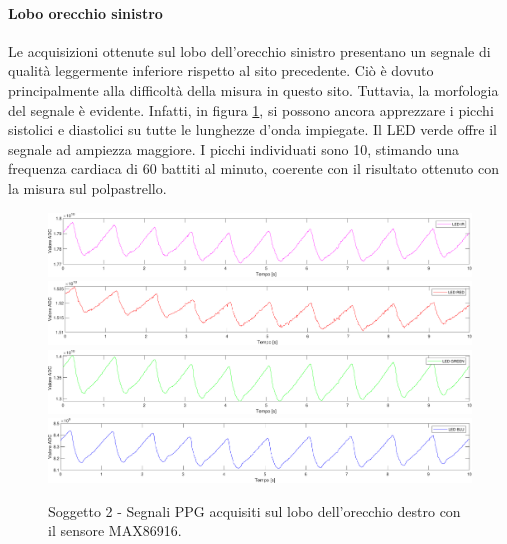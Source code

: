 \clearpage

\paragraph{Lobo orecchio sinistro}
Le acquisizioni ottenute sul lobo dell'orecchio sinistro presentano un segnale di qualità leggermente inferiore rispetto al sito precedente. Ciò è dovuto principalmente alla difficoltà della misura in questo sito. Tuttavia, la morfologia del segnale è evidente. Infatti, in figura \ref{fig:soggetto2_MAX86916_lobo}, si possono ancora apprezzare i picchi sistolici e diastolici su tutte le lunghezze d'onda impiegate. Il LED verde offre il segnale ad ampiezza maggiore. I picchi individuati sono 10, stimando una frequenza cardiaca di 60 battiti al minuto, coerente con il risultato ottenuto con la misura sul polpastrello.
\begin{figure}[h]
	\centering
	\includegraphics[width=1\linewidth]{ImageFiles/Misure Preliminari/Soggetto 2/max86916/lobo_ired}
	\includegraphics[width=1\linewidth]{ImageFiles/Misure Preliminari/Soggetto 2/max86916/lobo_red}
	\includegraphics[width=1\linewidth]{ImageFiles/Misure Preliminari/Soggetto 2/max86916/lobo_green}
	\includegraphics[width=1\linewidth]{ImageFiles/Misure Preliminari/Soggetto 2/max86916/lobo_blu}
	\caption{Soggetto 2 - Segnali PPG acquisiti sul lobo dell'orecchio destro con il sensore MAX86916.}
	\label{fig:soggetto2_MAX86916_lobo}
\end{figure}

\clearpage

